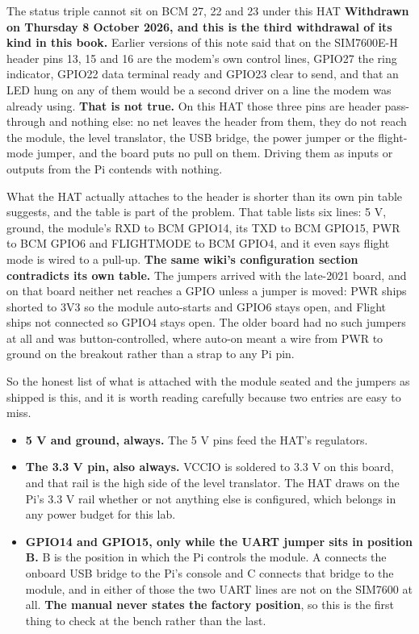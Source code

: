 \begin{note}{The status triple cannot sit on BCM 27, 22 and 23 under this HAT}
\textbf{Withdrawn on Thursday 8 October 2026, and this is the third withdrawal of its kind in this book.} Earlier versions of this note said that on the SIM7600E-H header pins 13, 15 and 16 are the modem's own control lines, GPIO27 the ring indicator, GPIO22 data terminal ready and GPIO23 clear to send, and that an LED hung on any of them would be a second driver on a line the modem was already using. \textbf{That is not true.} On this HAT those three pins are header pass-through and nothing else: no net leaves the header from them, they do not reach the module, the level translator, the USB bridge, the power jumper or the flight-mode jumper, and the board puts no pull on them. Driving them as inputs or outputs from the Pi contends with nothing.

What the HAT actually attaches to the header is shorter than its own pin table suggests, and the table is part of the problem. That table lists six lines: 5 V, ground, the module's RXD to BCM GPIO14, its TXD to BCM GPIO15, PWR to BCM GPIO6 and FLIGHTMODE to BCM GPIO4, and it even says flight mode is wired to a pull-up. \textbf{The same wiki's configuration section contradicts its own table.} The jumpers arrived with the late-2021 board, and on that board neither net reaches a GPIO unless a jumper is moved: PWR ships shorted to 3V3 so the module auto-starts and GPIO6 stays open, and Flight ships not connected so GPIO4 stays open. The older board had no such jumpers at all and was button-controlled, where auto-on meant a wire from PWR to ground on the breakout rather than a strap to any Pi pin.

So the honest list of what is attached with the module seated and the jumpers as shipped is this, and it is worth reading carefully because two entries are easy to miss.

\begin{itemize}
\item \textbf{5 V and ground, always.} The 5 V pins feed the HAT's regulators.
\item \textbf{The 3.3 V pin, also always.} VCCIO is soldered to 3.3 V on this board, and that rail is the high side of the level translator. The HAT draws on the Pi's 3.3 V rail whether or not anything else is configured, which belongs in any power budget for this lab.
\item \textbf{GPIO14 and GPIO15, only while the UART jumper sits in position B.} B is the position in which the Pi controls the module. A connects the onboard USB bridge to the Pi's console and C connects that bridge to the module, and in either of those the two UART lines are not on the SIM7600 at all. \textbf{The manual never states the factory position}, so this is the first thing to check at the bench rather than the last.
\end{itemize}


\end{note}
